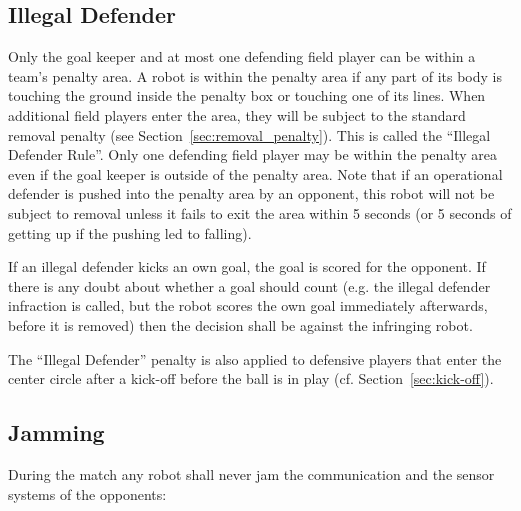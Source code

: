 \documentclass[12pt]{article}
\newcommand{\cf}{\mbox{cf.}\xspace}
\begin{document}
\subsection{Illegal Defender}
\label{sec:illegal_defender}

Only the goal keeper and at most one defending field player can be within a team's penalty area. A robot is within the penalty area if any part of its body is touching the ground inside the penalty box or touching one of its lines.  When additional field players enter the area, they will be subject to the standard removal penalty (see Section~\ref{sec:removal_penalty}). This is called the ``Illegal Defender Rule''. Only one defending field player may be within the penalty area even if the goal keeper is outside of the penalty area.  Note that if an operational defender is pushed into the penalty area by an opponent, this robot will not be subject to removal unless it fails to exit the area within 5 seconds (or 5 seconds of getting up if the pushing led to falling).

If an illegal defender kicks an own goal, the goal is scored for the opponent. If there is any doubt about whether a goal should count (e.g. the illegal defender infraction is called, but the robot scores the own goal immediately afterwards, before it is removed) then the decision shall be against the infringing robot.

The ``Illegal Defender'' penalty is also applied to defensive players that enter the center circle after a kick-off before the ball is in play (\cf Section~\ref{sec:kick-off}).

\subsection{Jamming}
\label{sec:jamming}
During the match any robot shall never jam the communication and the sensor systems of the opponents:
\end{document}

